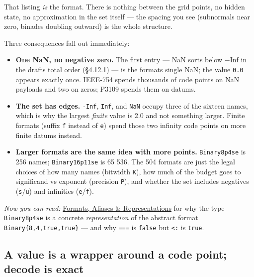That listing \emph{is} the format. There is nothing between the grid points, no hidden state, no approximation in the set itself — the spacing you see (subnormals near zero, binades doubling outward) is the whole structure.



Three consequences fall out immediately:



\begin{itemize}
\item \textbf{One NaN, no negative zero.} The first entry — NaN sorts below −Inf in the draft{\textquotesingle}s total order (§4.12.1) — is the format{\textquotesingle}s single NaN; the value \texttt{0.0} appears exactly once. IEEE-754 spends thousands of code points on NaN payloads and two on zeros; P3109 spends them on datums.


\item \textbf{The set has edges.} \texttt{-Inf}, \texttt{Inf}, and \texttt{NaN} occupy three of the sixteen names, which is why the largest \emph{finite} value is 2.0 and not something larger. Finite formats (suffix \texttt{f} instead of \texttt{e}) spend those two infinity code points on more finite datums instead.


\item \textbf{Larger formats are the same idea with more points.} \texttt{Binary8p4se} is 256 names; \texttt{Binary16p11se} is 65 536. The 504 formats are just the legal choices of how many names (bitwidth \texttt{K}), how much of the budget goes to significand vs exponent (precision \texttt{P}), and whether the set includes negatives (\texttt{s}/\allowbreak\texttt{u}) and infinities (\texttt{e}/\allowbreak\texttt{f}).

\end{itemize}


\emph{Now you can read:} \href{concept\_\allowbreak{}format\_\allowbreak{}anatomy.md}{Formats, Aliases \& Representations} for why the type \texttt{Binary8p4se} is a concrete \emph{representation} of the abstract format \texttt{Binary\{8,4,true,true\}} — and why \texttt{===} is \texttt{false} but \texttt{<:} is \texttt{true}.



\subsection{A value is a wrapper around a code point; decode is exact}




